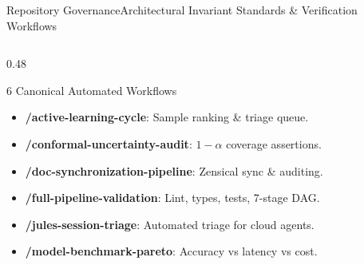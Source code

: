 \begin{frame}{Repository Governance}{Architectural Invariant Standards \& Verification Workflows}
\begin{columns}[T]
\begin{column}{0.48\textwidth}
\begin{block}{6 Canonical Automated Workflows}
\begin{itemize}
                    \item \textbf{/active-learning-cycle}: Sample ranking \& triage queue.
                    \item \textbf{/conformal-uncertainty-audit}: $1-\alpha$ coverage assertions.
                    \item \textbf{/doc-synchronization-pipeline}: Zensical sync \& auditing.
                    \item \textbf{/full-pipeline-validation}: Lint, types, tests, 7-stage DAG.
                    \item \textbf{/jules-session-triage}: Automated triage for cloud agents.
                    \item \textbf{/model-benchmark-pareto}: Accuracy vs latency vs cost.
                \end{itemize}
            \end{block}
        \end{column}
    \end{columns}

\end{frame}

